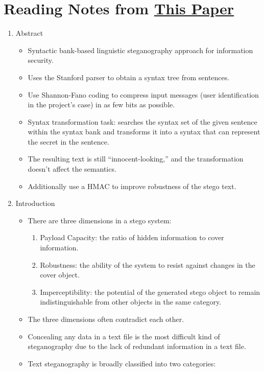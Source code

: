 \documentclass{article}
\begin{document}
\section{Reading Notes from \href{https://www.researchgate.net/publication/267767675_Syntactic_Bank-based_Linguistic_Steganography_Approach}{This Paper}}
\begin{enumerate}
\item Abstract
\begin{itemize}
    \item Syntactic bank-based linguistic steganography approach for information security.
    \item Uses the Stanford parser to obtain a syntax tree from sentences.
    \item Use Shannon-Fano coding to compress input messages (user identification in the project's case) in as few bits as possible.
    \item Syntax transformation task: searches the syntax set of the given sentence within the syntax bank and transforms it into a syntax that can represent the secret in the sentence.
    \item The resulting text is still ``innocent-looking,'' and the transformation doesn't affect the semantics.
\item Additionally use a HMAC to improve robustness of the stego text.
\end{itemize}
\item Introduction
\begin{itemize}
\item There are three dimensions in a stego system:
\begin{enumerate}
    \item Payload Capacity: the ratio of hidden information to cover information.
    \item Robustness: the ability of the system to resist against changes in the cover object.
    \item Imperceptibility: the potential of the generated stego object to remain indistinguishable from other objects in the same category.
\end{enumerate}
\item The three dimensions often contradict each other.
\item Concealing any data in a text file is the most difficult kind of steganography due to the lack of redundant information in a text file.
\item Text steganography is broadly classified into two categories:
\begin{enumerate}

\end{enumerate}
\end{itemize}
\end{enumerate}
\end{document}
